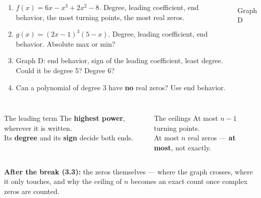 \documentclass[aspectratio=169, 11pt]{beamer}
\begin{document}
\begin{frame}[t, plain]

  \begin{columns}[T]
      \begin{enumerate}\setlength{\itemsep}{7pt}
        \setcounter{enumi}{14}
        \item \(f(x) = 6x - x^3 + 2x^2 - 8\). Degree, leading coefficient, end behavior,
              the most turning points, the most real zeros.
        \item \(g(x) = (2x - 1)^3(5 - x)\). Degree, leading coefficient, end behavior.
              Absolute max or min?
        \item Graph D: end behavior, sign of the leading coefficient, least degree. Could
              it be degree 5? Degree 6?
        \item Can a polynomial of degree 3 have \textbf{no} real zeros? Use end behavior.
      \end{enumerate}
      \begin{center}
      \\[2pt]
      \small Graph D
      \end{center}
  \end{columns}
\end{frame}

\begin{frame}[t, plain]

  \begin{columns}[T]
      \begin{block}{The leading term}
        The \textbf{highest power}, wherever it is written.\\[3pt]
        Its \textbf{degree} and its \textbf{sign} decide both ends.
      \end{block}
      \begin{block}{The ceilings}
        At most \(n - 1\) turning points.\\[3pt]
        At most \(n\) real zeros --- \textbf{at most}, not exactly.
      \end{block}
  \end{columns}

  \bigskip
  \textbf{After the break (3.3):} the zeros themselves --- where the graph crosses, where it
  only touches, and why the ceiling of \(n\) becomes an exact count once complex zeros are
  counted.
\end{frame}
\end{document}
